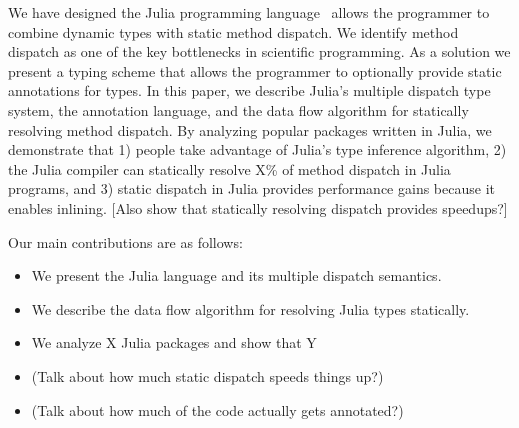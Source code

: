 We have designed the Julia programming language~\cite{Bezanson2012, Bezanson2014} allows the programmer to combine dynamic types with static method dispatch. We identify method dispatch as one of the key bottlenecks in scientific programming. As a solution we present a typing scheme that allows the programmer to optionally provide static annotations for types. In this paper, we describe Julia's multiple dispatch type system, the annotation language, and the data flow algorithm for statically resolving method dispatch. By analyzing popular packages written in Julia, we demonstrate that 1) people take advantage of Julia's type inference algorithm, 2) the Julia compiler can statically resolve X\% of method dispatch in Julia programs, and 3) static dispatch in Julia provides performance gains because it enables inlining. [Also show that statically resolving dispatch provides speedups?]



Our main contributions are as follows:
\begin{itemize}
\item We present the Julia language and its multiple dispatch semantics.
\item We describe the data flow algorithm for resolving Julia types statically.
\item We analyze X Julia packages and show that Y%
\item (Talk about how much static dispatch speeds things up?)
\item (Talk about how much of the code actually gets annotated?)
\end{itemize}

